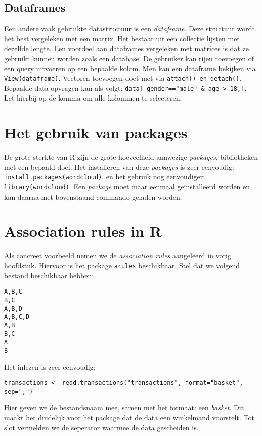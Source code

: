 \subsection{Dataframes}
Een andere vaak gebruikte datastructuur is een \emph{dataframe}. Deze structuur wordt het best vergeleken met een matrix. Het bestaat uit een collectie lijsten met dezelfde lengte. Een voordeel aan dataframes vergeleken met matrices is dat ze gebruikt kunnen worden  zoals een database. De gebruiker kan rijen toevoegen of een query uitvoeren op een bepaalde kolom. Men kan een dataframe bekijken via \texttt{View(dataframe)}. Vectoren toevoegen doet met via \texttt{attach() en detach()}. Bepaalde data opvragen kan als volgt: \texttt{data[ gender=="male" & age > 18,]}. Let hierbij op de komma om alle kolommen te selecteren.
%
\section{Het gebruik van packages}
De grote sterkte van R zijn de grote hoeveelheid aanwezige \emph{packages}, bibliotheken met een bepaald doel. Het installeren van deze \emph{packages} is zeer eenvoudig: \texttt{install.packages(wordcloud)}. en het gebruik nog eenvoudiger: \texttt{library(wordcloud)}. Een \emph{package} moet maar eenmaal ge\"installeerd worden en kan daarna met bovenstaand commando geladen worden.
%
\section{Association rules in R}
Als concreet voorbeeld nemen we de \emph{association rules} aangeleerd in vorig hoofdstuk. Hiervoor is het package \texttt{arules} beschikbaar.
Stel dat we volgend bestand beschikbaar hebben:
\begin{verbatim}
A,B,C
B,C
A,B,D
A,B,C,D
A,B
B,C
A
B
\end{verbatim}
Het inlezen is zeer eenvoudig:
\begin{verbatim}
transactions <- read.transactions("transactions", format="basket", sep=",")
\end{verbatim}
Hier geven we de bestandsnaam mee, samen met het formaat: een \emph{basket}. Dit maakt het duidelijk voor het package dat de data een winkelmand voorstelt. Tot slot vermelden we de seperator waarmee de data gescheiden is.

